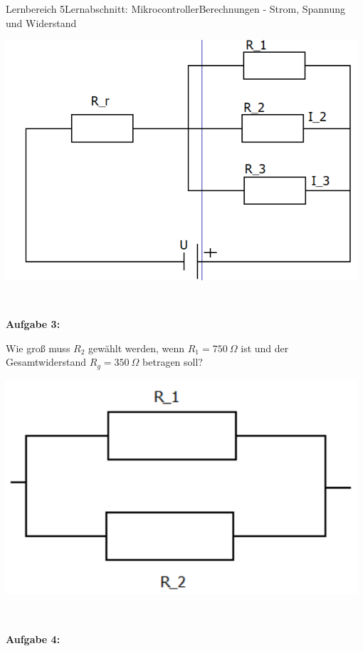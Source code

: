 \documentclass[oneside,openany,headings=optiontotoc,11pt,numbers=noenddot]{scrreprt}
\begin{document}
\begin{worksheet}{Lernbereich 5}{Lernabschnitt: Mikrocontroller}{Berechnungen - Strom, Spannung und Widerstand}
\begin{framed}
\begin{minipage}{0.5\textwidth}
					\includegraphics[width=0.98\textwidth]{../99_Bilder/A2.png}
				\end{minipage}\\
				\par\noindent
				\textbf{Aufgabe 3:}\\
				\begin{minipage}{0.58\textwidth}
					Wie groß muss \(R_2\) gewählt werden, wenn \(R_1 = 750\ \Omega\) ist und der Gesamtwiderstand \(R_g = 350\ \Omega\) betragen soll?
				\end{minipage}
				\hfill
				\begin{minipage}{0.38\textwidth}
					\includegraphics[width=0.98\textwidth]{../99_Bilder/A3.png}
				\end{minipage}\\
				\par\noindent
				\textbf{Aufgabe 4:}\\
				\begin{minipage}{0.58\textwidth}

\end{minipage}
\end{framed}
\end{worksheet}
\end{document}
